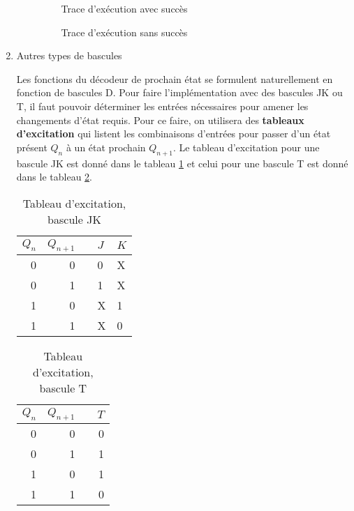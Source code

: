 \documentclass[letter, oneside]{book}
\begin{document}
\begin{enumerate}
\begin{enumerate}
\begin{figure}[htbp]
\centering

\caption{\label{fig:org5a54d81}Trace d'exécution avec succès}
\end{figure}

\begin{figure}[htbp]
\centering

\caption{\label{fig:org63ba74d}Trace d'exécution sans succès}
\end{figure}
\end{enumerate}

\item Autres types de bascules
\label{sec:org1692069}

Les fonctions du décodeur de prochain état se formulent naturellement
en fonction de bascules D.  Pour faire l'implémentation avec des
bascules JK ou T, il faut pouvoir déterminer les entrées nécessaires
pour amener les changements d'état requis. Pour ce faire, on
utilisera des \textbf{tableaux d'excitation} qui listent les combinaisons
d'entrées pour passer d'un état présent \(Q_n\) à un état prochain
\(Q_{n+1}\). Le tableau d'excitation pour une bascule JK est donné
dans le tableau \ref{tab:orge96b9f5} et celui pour une bascule T est donné
dans le tableau \ref{tab:org98d166b}.

\begin{table}[htbp]
\caption{\label{tab:orge96b9f5}Tableau d'excitation, bascule JK}
\centering
\begin{tabular}{rrlll}
\(Q_n\) & \(Q_{n+1}\) &  & \(J\) & \(K\)\\[0pt]
\hline
0 & 0 &  & 0 & X\\[0pt]
0 & 1 &  & 1 & X\\[0pt]
1 & 0 &  & X & 1\\[0pt]
1 & 1 &  & X & 0\\[0pt]
\end{tabular}
\end{table}

\begin{table}[htbp]
\caption{\label{tab:org98d166b}Tableau d'excitation, bascule T}
\centering
\begin{tabular}{rrlr}
\(Q_n\) & \(Q_{n+1}\) &  & \(T\)\\[0pt]
\hline
0 & 0 &  & 0\\[0pt]
0 & 1 &  & 1\\[0pt]
1 & 0 &  & 1\\[0pt]
1 & 1 &  & 0\\[0pt]
\end{tabular}
\end{table}


\end{enumerate}
\end{document}

